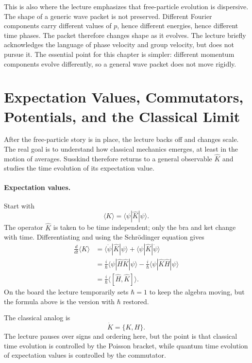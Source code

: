 This is also where the lecture emphasizes that free-particle evolution is dispersive. The shape of a generic wave packet is not preserved. Different Fourier components carry different values of \(p\), hence different energies, hence different time phases. The packet therefore changes shape as it evolves. The lecture briefly acknowledges the language of phase velocity and group velocity, but does not pursue it. The essential point for this chapter is simpler: different momentum components evolve differently, so a general wave packet does not move rigidly.

\section{Expectation Values, Commutators, Potentials, and the Classical Limit}

After the free-particle story is in place, the lecture backs off and changes scale. The real goal is to understand how classical mechanics emerges, at least in the motion of averages. Susskind therefore returns to a general observable \(\hat K\) and studies the time evolution of its expectation value.

\paragraph{Expectation values.}
Start with
\begin{equation}
\langle K\rangle = \langle\psi|\hat K|\psi\rangle.
\end{equation}
The operator \(\hat K\) is taken to be time independent; only the bra and ket change with time. Differentiating and using the Schr\"odinger equation gives
\begin{align}
\frac{d}{dt}\langle K\rangle
&=
\langle \dot\psi|\hat K|\psi\rangle
+
\langle \psi|\hat K|\dot\psi\rangle \\
&=
\frac{i}{\hbar}\langle \psi|\hat H \hat K|\psi\rangle
-
\frac{i}{\hbar}\langle \psi|\hat K \hat H|\psi\rangle \\
&=
\frac{i}{\hbar}\langle [\hat H,\hat K]\rangle.
\end{align}
On the board the lecture temporarily sets \(\hbar=1\) to keep the algebra moving, but the formula above is the version with \(\hbar\) restored.

The classical analog is
\begin{equation}
\dot K = \{K,H\}.
\end{equation}
The lecture pauses over signs and ordering here, but the point is that classical time evolution is controlled by the Poisson bracket, while quantum time evolution of expectation values is controlled by the commutator.

